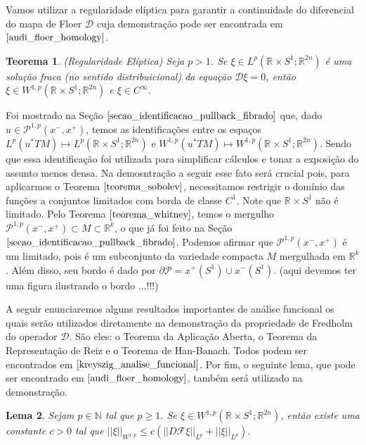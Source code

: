 \documentclass[12pt]{book}
\newtheorem{teorema}{Teorema}[section]
\newtheorem{lema}[teorema]{Lema}
\newcommand{\caminhosexponenciaisconectantesabrev}{\mathcal{P}}
\newcommand{\caminhosexponenciaisconectantes}[2]{\mathcal{P}^{1,p}(#1, #2)}
\newcommand{\caminhosexponenciaisconectantespadrao}{\caminhosexponenciaisconectantes{x^{-}}{x^{+}}}
\newcommand{\circulo}{S^{1}}
\newcommand{\diferencialmapafloer}{D\mapafloer}
\newcommand{\diferencialmapafloerabrev}{\mathcal{D}}
\newcommand{\espacoLp}[1]{L^{p}(#1)}
\newcommand{\espacoLpcontradominio}[2]{L^{p}(#1;#2)}
\newcommand{\espacosobolev}[1]{W^{1,p}(#1)}
\newcommand{\espacosobolevcontradominio}[2]{W^{1,p}(#1;#2)}
\newcommand{\mapafloer}{\mathcal{F}}
\newcommand{\normaLp}[1]{||#1||_{L^{p}}}
\newcommand{\normaWp}[1]{||#1||_{W^{1,p}}}
\newcommand{\pullbackfibradotangente}[2]{#1^{*}T#2}
\newcommand{\pullbackfibradotangenteM}[1]{\pullbackfibradotangente{#1}{M}}
\newcommand{\retacartesianocirculo}{\real{} \times \circulo}
\newcommand{\real}[1]{\mathbb{R}^{#1}}
\newcommand{\vermelho}[1]{{\color{red}#1}}
\begin{document}
	Vamos utilizar a regularidade elíptica para garantir a continuidade do diferencial do mapa de Floer $\diferencialmapafloerabrev$ cuja demonstração pode ser encontrada em $\cite{audi_floer_homology}$.
	
	\begin{teorema}
		(Regularidade Elíptica) Seja $p> 1$. Se $\xi \in \espacoLpcontradominio{\retacartesianocirculo}{\real{2n}}$ é uma solução fraca (no sentido distribuicional) da equação $\diferencialmapafloerabrev\xi =0$, então $\xi \in \espacosobolevcontradominio{\retacartesianocirculo}{\real{2n}}$ e $\xi \in C^{\infty}$.
	\end{teorema} 
	
	
	Foi mostrado na Seção $\ref{secao_identificacao_pullback_fibrado}$ que, dado $u \in \caminhosexponenciaisconectantespadrao$, temos as identificações entre os espaços  $\espacoLp{\pullbackfibradotangenteM{u}} \mapsto \espacoLpcontradominio{\retacartesianocirculo}{\real{2n}}$ e $\espacosobolev{\pullbackfibradotangenteM{u}} \mapsto \espacosobolevcontradominio{\retacartesianocirculo}{\real{2n}}$. Sendo que essa identificação foi utilizada para simplificar cálculos e tonar a exposição do assunto menos densa. Na demosntração a seguir esse fato será crucial pois, para aplicarmos o Teorema $\ref{teorema_sobolev}$, necessitamos restrigir o domínio das funções a conjuntos limitados com borda de classe $C^{1}$. Note que $\retacartesianocirculo$ não é limitado. Pelo Teorema $\ref{teorema_whitney}$, temos o mergulho $\caminhosexponenciaisconectantespadrao \subset M\subset \real{k}$, o que já foi feito na Seção $\ref{secao_identificacao_pullback_fibrado}$. Podemos afirmar que $\caminhosexponenciaisconectantespadrao$ é um limitado, pois é um subconjunto da variedade compacta $M$ mergulhada em $\real{k}$. Além disso, seu bordo é dado por $\partial \caminhosexponenciaisconectantesabrev =x^{+}(\circulo) \cup x^{-}(\circulo)$. \vermelho{(aqui devemos ter uma figura ilustrando o bordo ...!!!)}
	
	A seguir enunciaremos alguns resultados importantes de análise funcional os quais serão utilizados diretamente na demonstração da propriedade de Fredholm do operador $\diferencialmapafloerabrev$. São eles: o Teorema da Aplicação Aberta, o Teorema da Representação de Reiz e o Teorema de Han-Banach. Todos podem ser encontrados em $\cite{kreyszig_analise_funcional}$. Por fim, o seguinte lema, que pode ser encontrado em $\cite{audi_floer_homology}$, também será utilizado na demonstração.
	
	\begin{lema}\label{lema_desigualdade_inclusao_sobolev}
		Sejam $p \in \mathbb{N}$ tal que $p\geq 1$. Se $\xi \in \espacosobolevcontradominio{\retacartesianocirculo}{\real{2n}}$, então existe uma constante $c>0$ tal que $\normaWp{\xi}\leq c(\normaLp{\diferencialmapafloer \xi} +\normaLp{\xi})$.
	\end{lema}
	
\end{document}
